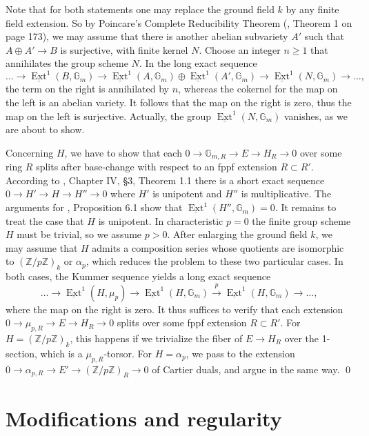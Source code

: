 \documentclass[oneside, 12pt]{amsart}
\newcommand\mylabel[1]{\label{#1}\marginpar{\vspace{-1ex}\medskip\medskip\footnotesize \tt #1}}
\renewcommand\mylabel[1]{\label{#1}}
\theoremstyle{definition}
\theoremstyle{remark}
\newcommand{\ZZ}{\mathbb{Z}}
\newcommand{\GG}{\mathbb{G}}
\newcommand{\lra}{\longrightarrow}
\newcommand{\ra}{\rightarrow}
\newcommand{\uExt}{\underline{\operatorname{Ext}}}
\begin{document}
\proof
Note that for both statements one  may replace the ground field $k$ by any finite field extension.
So by  Poincare's Complete Reducibility Theorem (\cite{Mumford 1970}, Theorem 1 on page 173), we   may assume that there is another 
abelian subvariety $A'$ such  that $A\oplus A'\ra B$ is surjective, with finite kernel $N$. Choose an integer $n\geq 1$ that annihilates
the group scheme $N$. In the long exact sequence
$$
\ldots\lra \uExt^1(B,\GG_m)\lra \uExt^1(A,\GG_m)\oplus\uExt^1(A',\GG_m)\lra \uExt^1(N,\GG_m)\lra \ldots,
$$
the term on the right is annihilated by $n$, whereas the cokernel for the map on the left is an abelian variety.
It follows that the  map on the right is zero, thus the map on the left is surjective.
Actually, the group $\uExt^1(N,\GG_m)$ vanishes, as we are about to show.
 
Concerning $H$, we have to show that each    $0\ra \GG_{m,R}\ra E\ra H_R\ra 0$ over some ring $R$ 
splits  after base-change with respect to an fppf extension  $R\subset R'$.
According to \cite{Demazure; Gabriel 1970}, Chapter IV, \S3, Theorem 1.1
there is a short exact sequence $0\ra H'\ra H\ra H''\ra 0$ where $H'$ is unipotent and $H''$ is multiplicative.
The arguments for \cite{Laurent; Schroeer 2021}, Proposition 6.1 show that $\uExt^1(H'',\GG_m)=0$.
It remains to treat the case that $H$ is unipotent. In characteristic $p=0$ the finite group scheme  $H$ must be trivial, so 
we assume $p>0$. After enlarging the ground field $k$, we may assume that
$H$ admits a composition series whose quotients are isomorphic to $(\ZZ/p\ZZ)_k$ or $\alpha_p$, which reduces the problem
to these two particular cases. In both cases, the Kummer sequence yields a long exact sequence
$$
\ldots\lra\uExt^1(H,\mu_p)\lra \uExt^1(H,\GG_m)\stackrel{p}{\lra} \uExt^1(H,\GG_m)\lra\ldots,
$$
where the map on the right is zero. It thus suffices to verify that each extension $0\ra \mu_{p,R}\ra E\ra H_R\ra 0$
splits over some fppf extension $R\subset R'$.
For $H=(\ZZ/p\ZZ)_k$, this happens if we trivialize the fiber of $E\ra H_R$ over the 1-section, which is a $\mu_{p,R}$-torsor.
For $H=\alpha_p$, we pass   to the  extension $0\ra \alpha_{p,R}\ra E'\ra (\ZZ/p\ZZ)_R\ra 0$ of Cartier duals,
and argue in the same way.
\qed


\section{Modifications and regularity}
\mylabel{Modifications}
\end{document}
